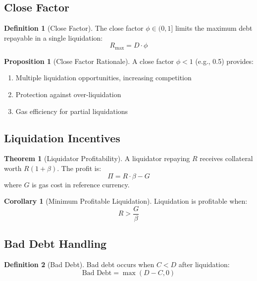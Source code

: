 \documentclass[11pt,a4paper]{article}
\theoremstyle{definition}
\newtheorem{definition}{Definition}
\newtheorem{theorem}{Theorem}
\newtheorem{proposition}{Proposition}
\newtheorem{corollary}{Corollary}
\begin{document}
\subsection{Close Factor}

\begin{definition}[Close Factor]
The close factor $\phi \in (0, 1]$ limits the maximum debt repayable in a single liquidation:
\begin{equation}
R_{\max} = D \cdot \phi
\end{equation}
\end{definition}

\begin{proposition}[Close Factor Rationale]
A close factor $\phi < 1$ (e.g., 0.5) provides:
\begin{enumerate}
\item Multiple liquidation opportunities, increasing competition
\item Protection against over-liquidation
\item Gas efficiency for partial liquidations
\end{enumerate}
\end{proposition}

\subsection{Liquidation Incentives}

\begin{theorem}[Liquidator Profitability]
A liquidator repaying $R$ receives collateral worth $R(1 + \beta)$. The profit is:
\begin{equation}
\Pi = R \cdot \beta - G
\end{equation}
where $G$ is gas cost in reference currency.
\end{theorem}

\begin{corollary}[Minimum Profitable Liquidation]
Liquidation is profitable when:
\begin{equation}
R > \frac{G}{\beta}
\end{equation}
\end{corollary}

\subsection{Bad Debt Handling}

\begin{definition}[Bad Debt]
Bad debt occurs when $C < D$ after liquidation:
\begin{equation}
\text{Bad Debt} = \max(D - C, 0)
\end{equation}
\end{definition}
\end{document}
